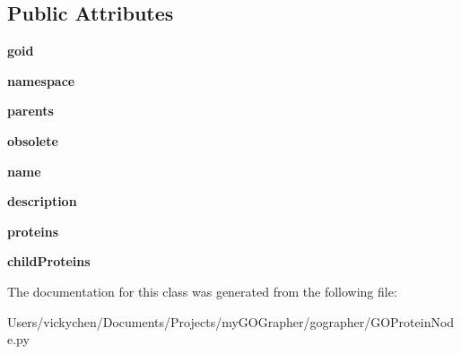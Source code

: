 \subsection*{Public Attributes}
\begin{DoxyCompactItemize}
\item 
\hypertarget{class_g_o_protein_node_1_1_g_o_protein_node_af96cbc9d0700be1a7153792d65347f39}{
{\bfseries goid}}
\label{class_g_o_protein_node_1_1_g_o_protein_node_af96cbc9d0700be1a7153792d65347f39}

\item 
\hypertarget{class_g_o_protein_node_1_1_g_o_protein_node_a8f538824bb0095108f442b5c7467c34a}{
{\bfseries namespace}}
\label{class_g_o_protein_node_1_1_g_o_protein_node_a8f538824bb0095108f442b5c7467c34a}

\item 
\hypertarget{class_g_o_protein_node_1_1_g_o_protein_node_acad325220c897d39ce0bdba143532f82}{
{\bfseries parents}}
\label{class_g_o_protein_node_1_1_g_o_protein_node_acad325220c897d39ce0bdba143532f82}

\item 
\hypertarget{class_g_o_protein_node_1_1_g_o_protein_node_a43161f37af36eedec1d10bef24d484df}{
{\bfseries obsolete}}
\label{class_g_o_protein_node_1_1_g_o_protein_node_a43161f37af36eedec1d10bef24d484df}

\item 
\hypertarget{class_g_o_protein_node_1_1_g_o_protein_node_a354a329cd145c58531582101897ee08b}{
{\bfseries name}}
\label{class_g_o_protein_node_1_1_g_o_protein_node_a354a329cd145c58531582101897ee08b}

\item 
\hypertarget{class_g_o_protein_node_1_1_g_o_protein_node_a248311f8178f70cadfcb50d94eab318f}{
{\bfseries description}}
\label{class_g_o_protein_node_1_1_g_o_protein_node_a248311f8178f70cadfcb50d94eab318f}

\item 
\hypertarget{class_g_o_protein_node_1_1_g_o_protein_node_ac6d420db24141333572c086df7c3ef91}{
{\bfseries proteins}}
\label{class_g_o_protein_node_1_1_g_o_protein_node_ac6d420db24141333572c086df7c3ef91}

\item 
\hypertarget{class_g_o_protein_node_1_1_g_o_protein_node_a6d2fe3a47ff6e8f08bb5f465bd711f63}{
{\bfseries childProteins}}
\label{class_g_o_protein_node_1_1_g_o_protein_node_a6d2fe3a47ff6e8f08bb5f465bd711f63}

\end{DoxyCompactItemize}


The documentation for this class was generated from the following file:\begin{DoxyCompactItemize}
\item 
Users/vickychen/Documents/Projects/myGOGrapher/gographer/GOProteinNode.py\end{DoxyCompactItemize}
